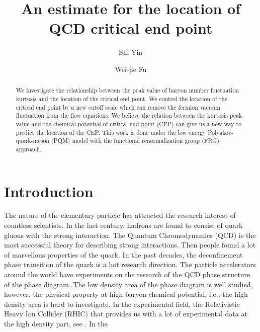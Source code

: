 \documentclass[%
reprint,
superscriptaddress,
showpacs,preprintnumbers,
 amsmath,amssymb,
 aps,
prd,
]{revtex4-1}
\begin{document}
\preprint{}

\title{An estimate for the location of QCD critical end point
}

\author{Shi Yin}


\author{Wei-jie Fu}


\begin{abstract}
We investigate the relationship between the peak value of baryon number fluctuation kurtosis and the location of the critical end point. We control the location of the critical end point by a new cutoff scale which can remove the fermion vacuum fluctuation from the flow equations. We believe the relation between the kurtosis peak value and the chemical potential of critical end point (CEP) can give us a new way to predict the location of the CEP. This work is done under the low energy Polyakov-quark-meson (PQM) model with the functional renormalization group (FRG) approach.
\end{abstract}
\maketitle
\section{Introduction}
\label{sec:int}
The nature of the elementary particle has attracted the research interest of countless scientists. In the last century, hadrons are found to consist of quark gluons with the strong interaction. The Quantum Chromodynamics (QCD) is the most successful theory for describing strong interactions. Then people found a lot of marvellous properties of the quark. In the past decades, the deconfinement phase transition of the quark is a hot research direction. The particle accelerators around the world have experiments on the research of the QCD phase structure of the phase diagram. The low density area of the phase diagram is well studied, however, the physical property at high baryon chemical potential, i.e., the high density area is hard to investigate. In the experimental field, the Relativistic Heavy Ion Collider (RHIC) that provides us with a lot of experimental data at the high density part, see \cite{Adamczyk:2013dal,Luo:2015ewa,Luo:2017faz}. In the 
\end{document}
